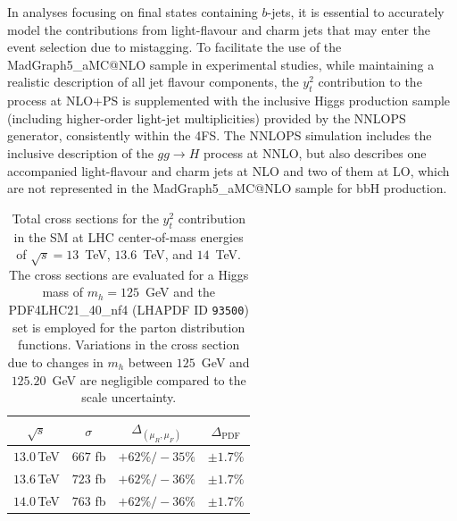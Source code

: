 \documentclass[11pt,a4paper]{article}
\begin{document}
In analyses focusing on final states containing $b$-jets, it is essential to accurately model the contributions 
from light-flavour and charm jets that may enter the event selection due to mistagging. 
To facilitate the use of the {\sc MadGraph5\_aMC@NLO} sample in experimental studies, 
while maintaining a realistic description of all jet flavour components, 
the $y_t^2$ contribution to the \bbH{} process at NLO+PS 
is supplemented with the inclusive Higgs production sample (including higher-order light-jet multiplicities) 
provided by the {\sc NNLOPS} generator, consistently within the 4FS.
The {\sc NNLOPS} simulation includes the inclusive description of the $gg \to H$ process at NNLO, but also describes 
one accompanied light-flavour and charm jets at NLO and two of them at LO, which are not represented in 
the {\sc MadGraph5\_aMC@NLO} sample for bbH{} production.

\begin{table}[b]
\begin{center}%
\begin{small}%
\begin{tabular}{|c|c|c|c|}%
\hline
$\sqrt{s}$ & $\sigma^{}$ & $\Delta_{\left(\mu_{R},\mu_{F}\right)}$ & $\Delta_{\mathrm{PDF}}$  \\\hline\hline
$13.0$\,TeV & $667$ fb & $+62\% / -35\%$ & $\pm 1.7\%$ \\\hline
$13.6$\,TeV  & $723$ fb & $+62\% / -36\%$ & $\pm 1.7\%$ \\\hline
$14.0$\,TeV & $763$ fb & $+62\% / -36\%$ & $\pm 1.7\%$ \\\hline
\end{tabular}%
\end{small}%
\end{center}%
\caption{Total \bbH{} cross sections for the $y_t^2$ contribution in the SM at LHC center-of-mass energies of $\sqrt{s} = 13$~TeV, $13.6$~TeV, and $14$~TeV. The cross sections are evaluated for a Higgs mass of $m_h = 125$~GeV and the PDF4LHC21\_40\_nf4 (LHAPDF ID \texttt{93500}) set is employed for the parton distribution functions. Variations in the cross section due to changes in $m_h$ between $125$~GeV and $125.20$~GeV are negligible compared to the scale uncertainty.}
\label{tab:bbHytxsec}
\end{table}
\end{document}
